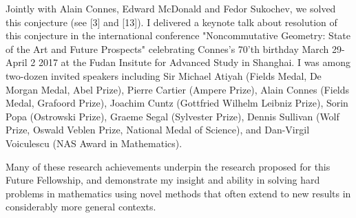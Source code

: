 \documentclass[12pt]{article}
\begin{document}
Jointly with Alain Connes, Edward McDonald and Fedor Sukochev, we solved this conjecture (see [3] and [13]). I delivered a keynote talk about resolution of this conjecture in the international conference "Noncommutative Geometry: State of the Art and Future Prospects" celebrating Connes's 70'th birthday March 29-April 2 2017 at the Fudan Insitute for Advanced Study in Shanghai. I was among two-dozen invited speakers including Sir Michael Atiyah (Fields Medal, De Morgan Medal, Abel Prize), Pierre Cartier (Ampere Prize), Alain Connes (Fields Medal, Grafoord Prize), Joachim Cuntz (Gottfried Wilhelm Leibniz Prize), Sorin Popa (Ostrowski Prize), Graeme Segal (Sylvester Prize), Dennis Sullivan (Wolf Prize, Oswald Veblen Prize, National Medal of Science), and Dan-Virgil Voiculescu (NAS Award in Mathematics).

Many of these research achievements underpin the research proposed for this Future Fellowship, and demonstrate my insight and ability in solving hard problems in mathematics using novel methods that often extend to new results in considerably more general contexts.
\end{document}

